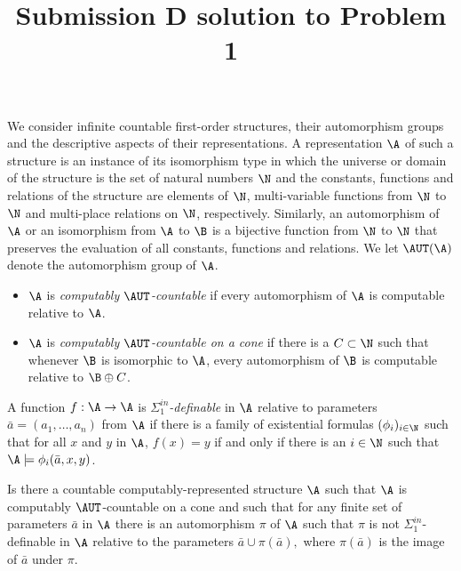 \title{Submission D solution to Problem 1}
\date{}
\maketitle

We consider infinite countable first-order structures, their automorphism groups and the descriptive aspects of their representations. A representation $\A$ of such a structure is an instance of its isomorphism type in which the universe or domain of the structure is the set of natural numbers $\N$ and the constants, functions and relations of the structure are elements of $\N$, multi-variable functions from $\N$ to $\N$ and multi-place relations on $\N$, respectively.   Similarly, an automorphism of $\A$ or an isomorphism from $\A$ to $\B$ is a bijective function from $\N$ to $\N$ that preserves the evaluation of all constants, functions and relations.  We let $\AUT(\A)$ denote the automorphism group of $\A$.

\begin{definition}\label{1.1}
  \begin{itemize}
  \item     $\A$ is \emph{computably $\AUT$-countable} if every automorphism of $\A$ is computable relative to $\A$.  
  \item  $\A$ is \emph{computably $\AUT$-countable on a cone} if there is a $C\subset\N$ such that whenever $\B$ is isomorphic to $\A$, every automorphism of $\B$ is computable relative to $\B\oplus C$.
  \end{itemize}
\end{definition}


\begin{definition}
  A function $f:\A\to\A$ is \emph{$\Sigma^{in}_1$-definable} in $\A$ relative to parameters
  $\bar{a}=(a_1,\dots,a_n)$ from $\A$ if there is a family of existential formulas $(\phi_i)_{i\in\N}$ such that for all $x$ and $y$ in $\A$, $f(x)=y$ if and only if there is an $i\in\N$ such that $\A\models\phi_i(\bar{a},x,y)$.
\end{definition}

\begin{question}\label{sec:question}\label{1.2}
  Is there a countable computably-represented structure $\A$ such that $\A$ is computably $\AUT$-countable on a cone and such that for any finite  set of parameters $\bar{a}$ in $\A$ there is an automorphism $\pi$ of $\A$ such that $\pi$ is not $\Sigma^{in}_1$-definable in $\A$ relative to the parameters $\bar{a}\cup \pi(\bar{a}),$ where $\pi(\bar{a})$ is the image of $\bar{a}$ under $\pi$.
\end{question}

